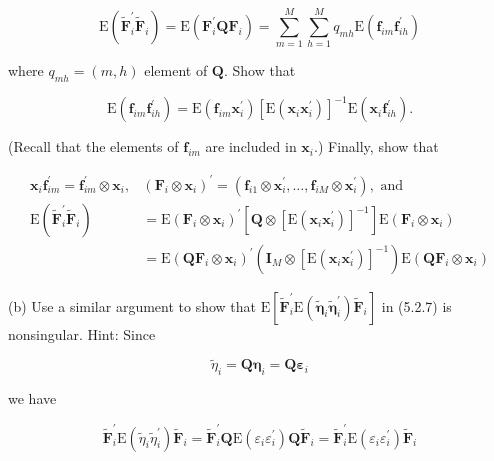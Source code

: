 \documentclass[10pt]{article}
\begin{document}
$$
\mathrm{E}\left(\widetilde{\mathbf{F}}_{i}^{\prime} \widetilde{\mathbf{F}}_{i}\right)=\mathrm{E}\left(\mathbf{F}_{i}^{\prime} \mathbf{Q} \mathbf{F}_{i}\right)=\sum_{m=1}^{M} \sum_{h=1}^{M} q_{m h} \mathrm{E}\left(\mathbf{f}_{i m} \mathbf{f}_{i h}^{\prime}\right)
$$

where $q_{m h}=(m, h)$ element of $\mathbf{Q}$. Show that

$$
\mathrm{E}\left(\mathbf{f}_{i m} \mathbf{f}_{i h}^{\prime}\right)=\mathrm{E}\left(\mathbf{f}_{i m} \mathbf{x}_{i}^{\prime}\right)\left[\mathrm{E}\left(\mathbf{x}_{i} \mathbf{x}_{i}^{\prime}\right)\right]^{-1} \mathrm{E}\left(\mathbf{x}_{i} \mathbf{f}_{i h}^{\prime}\right) .
$$

(Recall that the elements of $\mathbf{f}_{i m}$ are included in $\mathbf{x}_{i}$.) Finally, show that

$$
\begin{aligned}
\mathbf{x}_{i} \mathbf{f}_{i m}^{\prime}=\mathbf{f}_{i m}^{\prime} \otimes \mathbf{x}_{i}, & \left(\mathbf{F}_{i} \otimes \mathbf{x}_{i}\right)^{\prime}=\left(\mathbf{f}_{i 1} \otimes \mathbf{x}_{i}^{\prime}, \ldots, \mathbf{f}_{i M} \otimes \mathbf{x}_{i}^{\prime}\right), \text { and } \\
\mathrm{E}\left(\widetilde{\mathbf{F}}_{i}^{\prime} \widetilde{\mathbf{F}}_{i}\right) & =\mathrm{E}\left(\mathbf{F}_{i} \otimes \mathbf{x}_{i}\right)^{\prime}\left[\mathbf{Q} \otimes\left[\mathrm{E}\left(\mathbf{x}_{i} \mathbf{x}_{i}^{\prime}\right)\right]^{-1}\right] \mathrm{E}\left(\mathbf{F}_{i} \otimes \mathbf{x}_{i}\right) \\
& =\mathrm{E}\left(\mathbf{Q} \mathbf{F}_{i} \otimes \mathbf{x}_{i}\right)^{\prime}\left(\mathbf{I}_{M} \otimes\left[\mathrm{E}\left(\mathbf{x}_{i} \mathbf{x}_{i}^{\prime}\right)\right]^{-1}\right) \mathrm{E}\left(\mathbf{Q} \mathbf{F}_{i} \otimes \mathbf{x}_{i}\right)
\end{aligned}
$$

(b) Use a similar argument to show that $\mathrm{E}\left[\widetilde{\mathbf{F}}_{i}^{\prime} \mathrm{E}\left(\tilde{\boldsymbol{\eta}}_{i} \tilde{\boldsymbol{\eta}}_{i}^{\prime}\right) \widetilde{\mathbf{F}}_{i}\right]$ in (5.2.7) is nonsingular. Hint: Since

$$
\tilde{\eta}_{i}=\mathbf{Q} \boldsymbol{\eta}_{i}=\mathbf{Q} \boldsymbol{\varepsilon}_{i}
$$

we have

$$
\widetilde{\mathbf{F}}_{i}^{\prime} \mathrm{E}\left(\tilde{\eta}_{i} \tilde{\eta}_{i}^{\prime}\right) \widetilde{\mathbf{F}}_{i}=\widetilde{\mathbf{F}}_{i}^{\prime} \mathbf{Q} \mathrm{E}\left(\varepsilon_{i} \varepsilon_{i}^{\prime}\right) \mathbf{Q} \widetilde{\mathbf{F}}_{i}=\widetilde{\mathbf{F}}_{i}^{\prime} \mathrm{E}\left(\varepsilon_{i} \varepsilon_{i}^{\prime}\right) \widetilde{\mathbf{F}}_{i}
$$
\end{document}
